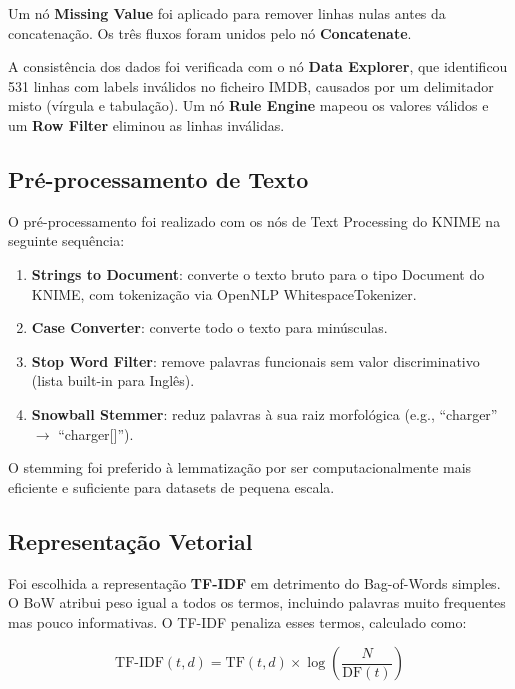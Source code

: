 \documentclass[10pt,twocolumn]{article}
\begin{document}
Um nó \textbf{Missing Value} foi aplicado para remover linhas nulas antes da concatenação. Os três fluxos foram unidos pelo nó \textbf{Concatenate}.

A consistência dos dados foi verificada com o nó \textbf{Data Explorer}, que identificou 531 linhas com labels inválidos no ficheiro IMDB, causados por um delimitador misto (vírgula e tabulação). Um nó \textbf{Rule Engine} mapeou os valores válidos e um \textbf{Row Filter} eliminou as linhas inválidas.

\subsection{Pré-processamento de Texto}

O pré-processamento foi realizado com os nós de Text Processing do KNIME na seguinte sequência:

\begin{enumerate}
  \item \textbf{Strings to Document}: converte o texto bruto para o tipo Document do KNIME, com tokenização via OpenNLP WhitespaceTokenizer.
  \item \textbf{Case Converter}: converte todo o texto para minúsculas.
  \item \textbf{Stop Word Filter}: remove palavras funcionais sem valor discriminativo (lista built-in para Inglês).
  \item \textbf{Snowball Stemmer}: reduz palavras à sua raiz morfológica (e.g., ``charger'' $\rightarrow$ ``charger[]'').
\end{enumerate}

O stemming foi preferido à lemmatização por ser computacionalmente mais eficiente e suficiente para datasets de pequena escala.

\subsection{Representação Vetorial}

Foi escolhida a representação \textbf{TF-IDF} em detrimento do Bag-of-Words simples. O BoW atribui peso igual a todos os termos, incluindo palavras muito frequentes mas pouco informativas. O TF-IDF penaliza esses termos, calculado como:

\begin{equation}
\text{TF-IDF}(t, d) = \text{TF}(t, d) \times \log\left(\frac{N}{\text{DF}(t)}\right)
\end{equation}
\end{document}
